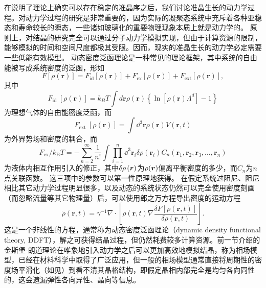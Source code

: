 \documentclass[hyperref, UTF8, a4paper]{ctexart}
\begin{document}
在说明了理论上确实可以存在稳定的准晶序之后，我们讨论准晶生长的动力学过程。对动力学过程的研究是非常重要的，因为实际的凝聚态系统中充斥着各种亚稳态和寿命较长的瞬态\cite{PhysRevB.75.064107}，一些诸如玻璃化的重要物理现象本质上就是动力学的\cite{mct-primer}。
原则上，对结晶的研究完全可以通过分子动力学模拟实现，但由于计算资源的限制，能够模拟的时间和空间尺度都极其受限\cite{PhysRevLett.88.245701}。因而，现实的准晶生长的动力学必定需要一些低能有效模型。
动态密度泛函理论是一种常见的理论框架\cite{pfc2009,PhysRevB.75.064107}，其中系统的自由能被写成系统密度的泛函，形如
\begin{equation}
    F[\rho(\boldsymbol{r})]=F_{\mathrm{id}}[\rho(\boldsymbol{r})]+F_{\mathrm{ex}}[\rho(\boldsymbol{r})]+F_{\mathrm{ext}}[\rho(\boldsymbol{r})],
\end{equation}
其中
\begin{equation}
    F_{\text {id }}[\rho(\boldsymbol{r})]=k_{B} T \int d \boldsymbol{r} \rho(\boldsymbol{r})\left\{\ln \left[\rho(\boldsymbol{r}) \Lambda^{d}\right]-1\right\}
    \label{eq:id-free-energy}
\end{equation}
为理想气体的自由能密度泛函，而
\begin{equation}
    F_{\text {ext }}[\rho(\boldsymbol{r})]=\int \dd^3 \boldsymbol{r} \rho(\boldsymbol{r}) V(\boldsymbol{r}, t)
\end{equation}
为外界势场和密度的耦合，而
\begin{equation}
    {F}_\text{ex} / k_\text{B} T=-\sum_{n=2}^{\infty} \frac{1}{n !} \int \prod_{i=1}^{n} \dd^3 \boldsymbol{r}_{i} \delta \rho\left(\boldsymbol{r}_{i}\right) C_{n}\left(\boldsymbol{r}_{1}, \boldsymbol{r}_{2}, \boldsymbol{r}_{3}, \ldots, \boldsymbol{r}_{n} \right)
    \label{eq:ex-free-energy}
\end{equation}
为液体内相互作用引入的修正，其中$\var{\rho}(\vb*{r})$为$\rho(\vb*{r})$偏离平衡密度的多少，而$C_n$为$n$点关联函数。
这三项中的参数可以第一性原理地获得。
在假定系统过阻尼、阻尼相比其它动力学过程明显很多，以及动态的系统状态仍然可以完全使用密度刻画（而忽略流量等其它物理量）后，可以使用郎之万方程导出密度的运动方程\cite{pfc2009,PhysRevB.75.064107}
\begin{equation}
    \dot{\rho}(\mathbf{r}, t)=\gamma^{-1} \nabla \cdot\left[\rho(\mathbf{r}, t) \nabla \frac{\delta F[\rho(\mathbf{r}, t)]}{\delta \rho(\mathbf{r}, t)}\right].
    \label{eq:ddft}
\end{equation}
这是一个非线性的方程，通常称为动态密度泛函理论（dynamic density functional theory, DDFT），解之可获得结晶过程\cite{Neuhaus_2014}，但仍然耗费较多计算资源。前一节介绍的金斯堡-朗道理论在唯象地引入动力学之后可以更加高效地模拟结晶，称为相场模型，已经在材料科学中取得了广泛应用，但一般的相场模型通常直接将周期性的密度场平滑化（如见）到看不清其晶格结构，即假定晶相内部完全是均匀各向同性的，这会遗漏弹性各向异性、晶向等信息。
\end{document}
